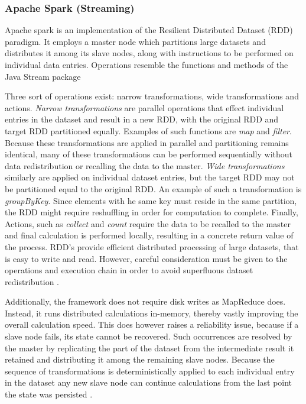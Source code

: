 \subsubsection{Apache Spark (Streaming)}
Apache spark \cite{web:spark} is an implementation of the Resilient Distributed Dataset (RDD) paradigm. It employs a master node which partitions large datasets and distributes it among its slave nodes, along with instructions to be performed on individual data entries. Operations resemble the functions and methods of the Java Stream package \cite{java_stream}

Three sort of operations exist: narrow transformations, wide transformations and actions. \emph{Narrow transformations} are parallel operations that effect individual entries in the dataset and result in a new RDD, with the original RDD and target RDD partitioned equally. Examples of such functions are \emph{map} and \emph{filter}. Because these transformations are applied in parallel and partitioning remains identical, many of these transformations can be performed sequentially without data redistribution or recalling the data to the master. \emph{Wide transformations} similarly are applied on individual dataset entries, but the target RDD may not be partitioned equal to the original RDD. An example of such a transformation is \emph{groupByKey}. Since elements with  he same key must reside in the same partition, the RDD might require reshuffling in order for computation to complete. Finally, Actions, such as \emph{collect} and \emph{count} require the data to be recalled to the master and final calculation is performed locally, resulting in a concrete return value of the process. RDD's provide efficient distributed processing of large datasets, that is easy to write and read. However, careful consideration must be given to the operations and execution chain in order to avoid superfluous dataset redistribution \cite{spark_programming_guide}.

Additionally, the framework does not require disk writes as MapReduce does. Instead, it runs distributed calculations in-memory, thereby vastly improving the overall calculation speed. This does however raises a reliability issue, because if a slave node fails, its state cannot be recovered. Such occurrences are resolved by the master by replicating the part of the dataset from the intermediate result it retained and distributing it among the remaining slave nodes. Because the sequence of transformations is deterministically applied to each individual entry in the dataset any new slave node can continue calculations from the last point the state was persisted \cite{rdd_fault_tolerance}.

